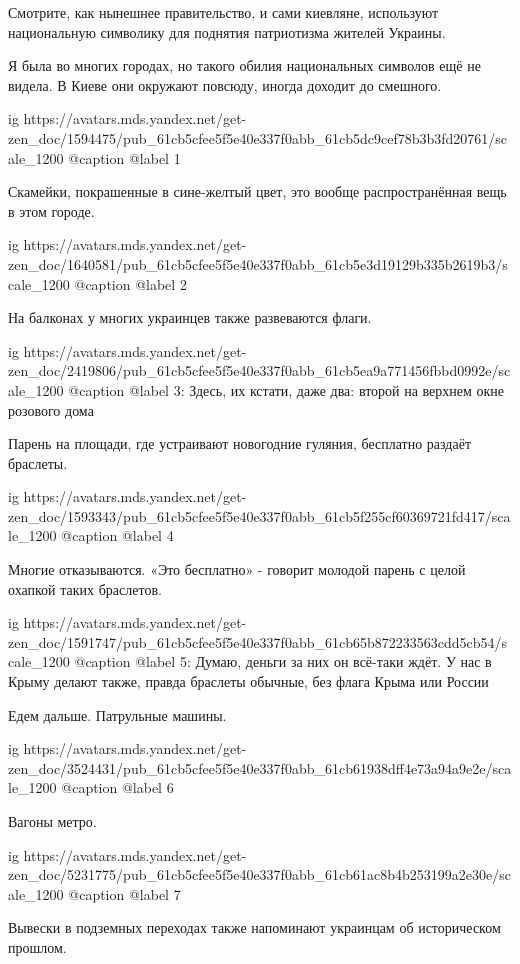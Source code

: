 \raggedcolumns
\begin{multicols}{3} %
\setlength{\parindent}{0pt}

Смотрите, как нынешнее правительство, и сами киевляне, используют национальную
символику для поднятия патриотизма жителей Украины.

Я была во многих городах, но такого обилия национальных символов ещё не видела.
В Киеве они окружают повсюду, иногда доходит до смешного.

\ifcmt
  ig https://avatars.mds.yandex.net/get-zen_doc/1594475/pub_61cb5cfee5f5e40e337f0abb_61cb5dc9cef78b3b3fd20761/scale_1200
  @caption @label 1
\fi

Скамейки, покрашенные в сине-желтый цвет, это вообще распространённая вещь в этом городе.

\ifcmt
  ig https://avatars.mds.yandex.net/get-zen_doc/1640581/pub_61cb5cfee5f5e40e337f0abb_61cb5e3d19129b335b2619b3/scale_1200
  @caption @label 2
\fi

На балконах у многих украинцев также развеваются флаги. 

\ifcmt
  ig https://avatars.mds.yandex.net/get-zen_doc/2419806/pub_61cb5cfee5f5e40e337f0abb_61cb5ea9a771456fbbd0992e/scale_1200
  @caption @label 3: Здесь, их кстати, даже два: второй на верхнем окне розового дома 
\fi

Парень на площади, где устраивают новогодние гуляния, бесплатно раздаёт
браслеты.  

\ifcmt
  ig https://avatars.mds.yandex.net/get-zen_doc/1593343/pub_61cb5cfee5f5e40e337f0abb_61cb5f255cf60369721fd417/scale_1200
  @caption @label 4
\fi


Многие отказываются. «Это бесплатно» - говорит молодой парень с
целой охапкой таких браслетов.

\ifcmt
  ig https://avatars.mds.yandex.net/get-zen_doc/1591747/pub_61cb5cfee5f5e40e337f0abb_61cb65b872233563cdd5cb54/scale_1200
  @caption @label 5: Думаю, деньги за них он всё-таки ждёт. У нас в Крыму делают также, правда браслеты обычные, без флага Крыма или России 
\fi

Едем дальше. Патрульные машины.

\ifcmt
  ig https://avatars.mds.yandex.net/get-zen_doc/3524431/pub_61cb5cfee5f5e40e337f0abb_61cb61938dff4e73a94a9e2e/scale_1200
  @caption @label 6
\fi

Вагоны метро.

\ifcmt
  ig https://avatars.mds.yandex.net/get-zen_doc/5231775/pub_61cb5cfee5f5e40e337f0abb_61cb61ac8b4b253199a2e30e/scale_1200
  @caption @label 7
\fi

Вывески в подземных переходах также напоминают украинцам об историческом прошлом.


\end{multicols} %
